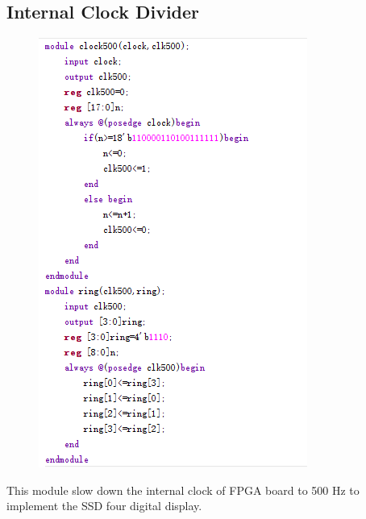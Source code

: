 \documentclass[12pt]{article}
\begin{document}
\subsection{Internal Clock Divider}
\begin{figure}[H]
\centering
\includegraphics[scale=1]{CD.jpg}
\end{figure}
This module slow down the internal clock of FPGA board to 500 Hz to implement the SSD four digital display.
\end{document}

